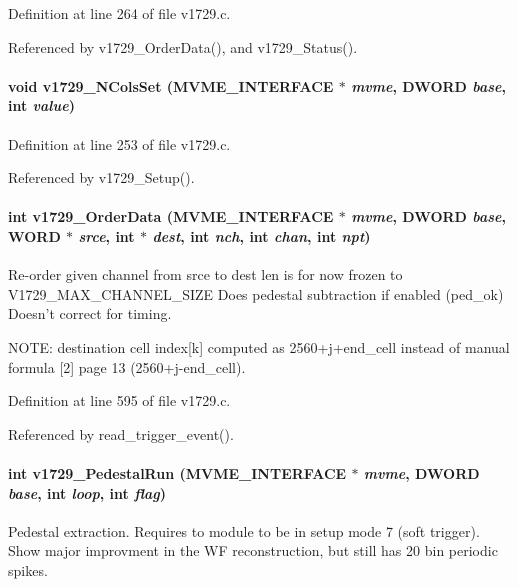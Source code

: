 Definition at line 264 of file v1729.c.

Referenced by v1729\_\-OrderData(), and v1729\_\-Status().
\paragraph[{v1729\_\-NColsSet}]{\setlength{\rightskip}{0pt plus 5cm}void v1729\_\-NColsSet ({\bf MVME\_\-INTERFACE} $\ast$ {\em mvme}, \/  {\bf DWORD} {\em base}, \/  int {\em value})}\hfill\label{v1729_8h_a4ab00eb7decf0235dec7f0918ae1d820}


Definition at line 253 of file v1729.c.

Referenced by v1729\_\-Setup().
\paragraph[{v1729\_\-OrderData}]{\setlength{\rightskip}{0pt plus 5cm}int v1729\_\-OrderData ({\bf MVME\_\-INTERFACE} $\ast$ {\em mvme}, \/  {\bf DWORD} {\em base}, \/  {\bf WORD} $\ast$ {\em srce}, \/  int $\ast$ {\em dest}, \/  int {\em nch}, \/  int {\em chan}, \/  int {\em npt})}\hfill\label{v1729_8h_a00581252de478e322887b9cd6a2242d4}
Re-\/order given channel from srce to dest len is for now frozen to V1729\_\-MAX\_\-CHANNEL\_\-SIZE Does pedestal subtraction if enabled (ped\_\-ok) Doesn't correct for timing.

NOTE: destination cell index\mbox{[}k\mbox{]} computed as 2560+j+end\_\-cell instead of manual formula \mbox{[}2\mbox{]} page 13 (2560+j-\/end\_\-cell). 

Definition at line 595 of file v1729.c.

Referenced by read\_\-trigger\_\-event().
\paragraph[{v1729\_\-PedestalRun}]{\setlength{\rightskip}{0pt plus 5cm}int v1729\_\-PedestalRun ({\bf MVME\_\-INTERFACE} $\ast$ {\em mvme}, \/  {\bf DWORD} {\em base}, \/  int {\em loop}, \/  int {\em flag})}\hfill\label{v1729_8h_a135c3c66398c94b6bee6cccad799cfec}
Pedestal extraction. Requires to module to be in setup mode 7 (soft trigger). Show major improvment in the WF reconstruction, but still has 20 bin periodic spikes.

